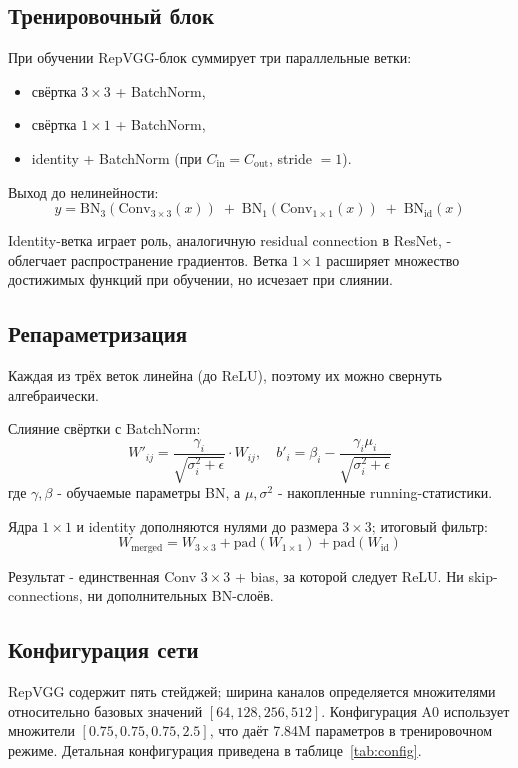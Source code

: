 \documentclass[12pt,a4paper]{article}
\newcommand{\repvggParams}{7.84}
\begin{document}
\subsection{Тренировочный блок}

При обучении RepVGG-блок суммирует три параллельные ветки:
\begin{itemize}
    \item свёртка $3\times3$ + BatchNorm,
    \item свёртка $1\times1$ + BatchNorm,
    \item identity + BatchNorm (при $C_{\text{in}} = C_{\text{out}}$, stride $= 1$).
\end{itemize}

Выход до нелинейности:
\[
y = \text{BN}_3(\text{Conv}_{3\times3}(x)) \;+\; \text{BN}_1(\text{Conv}_{1\times1}(x)) \;+\; \text{BN}_{\text{id}}(x)
\]

Identity-ветка играет роль, аналогичную residual connection в ResNet, - облегчает распространение градиентов. Ветка $1\times1$ расширяет множество достижимых функций при обучении, но исчезает при слиянии.

\subsection{Репараметризация}

Каждая из трёх веток линейна (до ReLU), поэтому их можно свернуть алгебраически.

Слияние свёртки с BatchNorm:
\[
W'_{ij} = \frac{\gamma_i}{\sqrt{\sigma_i^2 + \epsilon}} \cdot W_{ij}, \quad
b'_i = \beta_i - \frac{\gamma_i \mu_i}{\sqrt{\sigma_i^2 + \epsilon}}
\]
где $\gamma, \beta$ - обучаемые параметры BN, а $\mu, \sigma^2$ - накопленные running-статистики.

Ядра $1\times1$ и identity дополняются нулями до размера $3\times3$; итоговый фильтр:
\[
W_{\text{merged}} = W_{3\times3} + \text{pad}(W_{1\times1}) + \text{pad}(W_{\text{id}})
\]

Результат - единственная Conv $3\times3$ + bias, за которой следует ReLU. Ни skip-connections, ни дополнительных BN-слоёв.

\subsection{Конфигурация сети}

RepVGG содержит пять стейджей; ширина каналов определяется множителями относительно базовых значений $[64, 128, 256, 512]$. Конфигурация A0 использует множители $[0.75, 0.75, 0.75, 2.5]$, что даёт \repvggParams{}M параметров в тренировочном режиме. Детальная конфигурация приведена в таблице~\ref{tab:config}.
\end{document}
